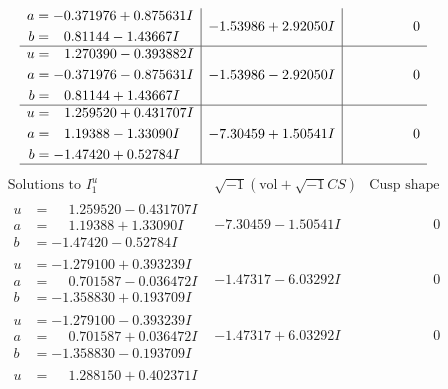 \documentclass[1p]{elsarticle_modified}
\theoremstyle{definition}
\newcommand{\I}{\sqrt{-1}}
\begin{document}
$$\begin{array}{c|c|c}
\begin{aligned}
a &= -0.371976 + 0.875631 I \\
b &= \phantom{-}0.81144 - 1.43667 I\end{aligned}
 & -1.53986 + 2.92050 I & \phantom{-0.000000 } 0 \\ \hline\begin{aligned}
u &= \phantom{-}1.270390 - 0.393882 I \\
a &= -0.371976 - 0.875631 I \\
b &= \phantom{-}0.81144 + 1.43667 I\end{aligned}
 & -1.53986 - 2.92050 I & \phantom{-0.000000 } 0 \\ \hline\begin{aligned}
u &= \phantom{-}1.259520 + 0.431707 I \\
a &= \phantom{-}1.19388 - 1.33090 I \\
b &= -1.47420 + 0.52784 I\end{aligned}
 & -7.30459 + 1.50541 I & \phantom{-0.000000 } 0\\
 \hline 
 \end{array}$$\newpage$$\begin{array}{c|c|c}  
\text{Solutions to }I^u_{1}& \I (\text{vol} + \sqrt{-1}CS) & \text{Cusp shape}\\
 \hline 
\begin{aligned}
u &= \phantom{-}1.259520 - 0.431707 I \\
a &= \phantom{-}1.19388 + 1.33090 I \\
b &= -1.47420 - 0.52784 I\end{aligned}
 & -7.30459 - 1.50541 I & \phantom{-0.000000 } 0 \\ \hline\begin{aligned}
u &= -1.279100 + 0.393239 I \\
a &= \phantom{-}0.701587 - 0.036472 I \\
b &= -1.358830 + 0.193709 I\end{aligned}
 & -1.47317 - 6.03292 I & \phantom{-0.000000 } 0 \\ \hline\begin{aligned}
u &= -1.279100 - 0.393239 I \\
a &= \phantom{-}0.701587 + 0.036472 I \\
b &= -1.358830 - 0.193709 I\end{aligned}
 & -1.47317 + 6.03292 I & \phantom{-0.000000 } 0 \\ \hline\begin{aligned}
u &= \phantom{-}1.288150 + 0.402371 I \\

\end{aligned}
\end{array}$$
\end{document}
